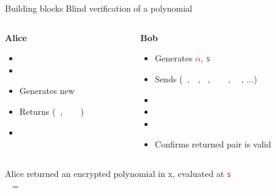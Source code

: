 \documentclass[dvipsnames]{beamer}
\newcommand{\priv}[1]{\textcolor{brown}{\texttt{#1}}}
\newcommand{\enc}[1]{\colorbox{SkyBlue!75}{\textcolor{white}{\texttt{#1}}}}
\begin{document}
    \begin{frame}{Building blocks}
        Blind verification of a polynomial
        \vspace{0.5cm}

        \begin{columns}
            \begin{column}{0.4\textwidth}
                \textbf{Alice}
                \begin{itemize}
                    \item[]
                    \item[]
                    \item Generates new \enc{X}
                    \item Returns (\enc{X}, \enc{$\alpha \cdot$X})
                    \item[]
                \end{itemize}
            \end{column}
            \begin{column}{0.6\textwidth}
                \textbf{Bob}
                \begin{itemize}
                    \item Generates \priv{$\alpha$}, \priv{s}
                    \item Sends (\enc{1}, \enc{$\alpha$}, \enc{s}, \enc{$\alpha \cdot$s}, \enc{s$^2$}, ...)
                    \item[]
                    \item[]
                    \item[] \item Confirms returned pair is valid
                \end{itemize}
            \end{column}
        \end{columns}
        \begin{center}
            Alice returned an encrypted polynomial in x, evaluated at \priv{s}\\
            \enc{X} = \enc{a$_0$ + a$_1$s + a$_2$s$^2$ + a$_3$s$^3$}
        \end{center}
    \end{frame}
\end{document}
